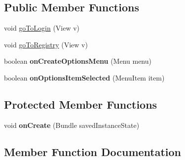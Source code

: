\subsection*{Public Member Functions}
\begin{DoxyCompactItemize}
\item 
void \hyperlink{classcom_1_1example_1_1sebastian_1_1tindertp_1_1SelectLoginOrRegistryActivity_a7d56aa8cddbad4543efa740c15fcefb6}{go\+To\+Login} (View v)
\item 
void \hyperlink{classcom_1_1example_1_1sebastian_1_1tindertp_1_1SelectLoginOrRegistryActivity_a65b47af2bace011dff5c75a249af1001}{go\+To\+Registry} (View v)
\item 
boolean {\bfseries on\+Create\+Options\+Menu} (Menu menu)\hypertarget{classcom_1_1example_1_1sebastian_1_1tindertp_1_1SelectLoginOrRegistryActivity_a872ec6abd44b28c911719c8f4b796362}{}\label{classcom_1_1example_1_1sebastian_1_1tindertp_1_1SelectLoginOrRegistryActivity_a872ec6abd44b28c911719c8f4b796362}

\item 
boolean {\bfseries on\+Options\+Item\+Selected} (Menu\+Item item)\hypertarget{classcom_1_1example_1_1sebastian_1_1tindertp_1_1SelectLoginOrRegistryActivity_a6bbc57e5357cda312581d244fa8bc98d}{}\label{classcom_1_1example_1_1sebastian_1_1tindertp_1_1SelectLoginOrRegistryActivity_a6bbc57e5357cda312581d244fa8bc98d}

\end{DoxyCompactItemize}
\subsection*{Protected Member Functions}
\begin{DoxyCompactItemize}
\item 
void {\bfseries on\+Create} (Bundle saved\+Instance\+State)\hypertarget{classcom_1_1example_1_1sebastian_1_1tindertp_1_1SelectLoginOrRegistryActivity_a060ae2b585e54e090adfcdf24aa05a6a}{}\label{classcom_1_1example_1_1sebastian_1_1tindertp_1_1SelectLoginOrRegistryActivity_a060ae2b585e54e090adfcdf24aa05a6a}

\end{DoxyCompactItemize}


\subsection{Member Function Documentation}
